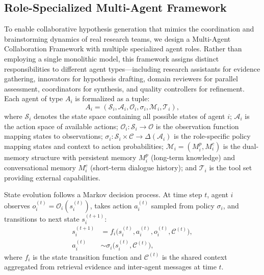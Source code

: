 \documentclass[runningheads]{llncs}
\begin{document}
\subsection{Role-Specialized Multi-Agent Framework}
\label{sec:workflow}

To enable collaborative hypothesis generation that mimics the coordination and brainstorming dynamics of real research teams, we design a Multi-Agent Collaboration Framework with multiple specialized agent roles. Rather than employing a single monolithic model, this framework assigns distinct responsibilities to different agent types---including research assistants for evidence gathering, innovators for hypothesis drafting, domain reviewers for parallel assessment, coordinators for synthesis, and quality controllers for refinement. Each agent of type $A_i$ is formalized as a tuple:
\begin{equation}
    A_i = (\mathcal{S}_i, \mathcal{A}_i, \mathcal{O}_i, \sigma_i, \mathcal{M}_i, \mathcal{T}_i),
\end{equation}
where $\mathcal{S}_i$ denotes the state space containing all possible states of agent $i$; $\mathcal{A}_i$ is the action space of available actions; $\mathcal{O}_i: \mathcal{S}_i \rightarrow \mathcal{O}$ is the observation function mapping states to observations; $\sigma_i: \mathcal{S}_i \times \mathcal{C} \rightarrow \Delta(\mathcal{A}_i)$ is the role-specific policy mapping states and context to action probabilities; $\mathcal{M}_i = (M_i^p, M_i^c)$ is the dual-memory structure with persistent memory $M_i^p$ (long-term knowledge) and conversational memory $M_i^c$ (short-term dialogue history); and $\mathcal{T}_i$ is the tool set providing external capabilities.

State evolution follows a Markov decision process. At time step $t$, agent $i$ observes $o_i^{(t)} = \mathcal{O}_i(s_i^{(t)})$, takes action $a_i^{(t)}$ sampled from policy $\sigma_i$, and transitions to next state $s_i^{(t+1)}$:
\begin{align}
    s_i^{(t+1)} &= f_i\big(s_i^{(t)}, a_i^{(t)}, o_i^{(t)}, \mathcal{C}^{(t)}\big), \\
    a_i^{(t)} &\sim \sigma_i\big(s_i^{(t)}, \mathcal{C}^{(t)}\big),
\end{align}
where $f_i$ is the state transition function and $\mathcal{C}^{(t)}$ is the shared context aggregated from retrieval evidence and inter-agent messages at time $t$.
\end{document}
